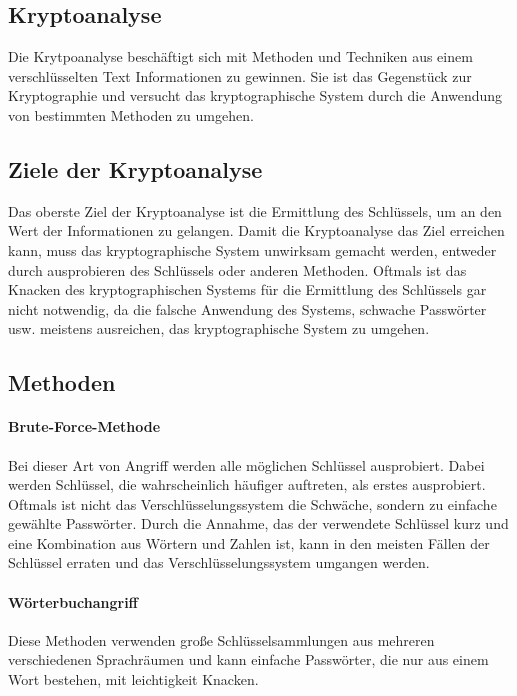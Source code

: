 \documentclass[12pt,a4paper]{report}
\begin{document}
\begin{onehalfspace}
\newpage
\section{Kryptoanalyse}

Die Krytpoanalyse beschäftigt sich mit Methoden und Techniken aus einem verschlüsselten Text Informationen zu gewinnen. Sie ist das Gegenstück zur Kryptographie und versucht das kryptographische System durch die Anwendung von bestimmten Methoden zu umgehen.

\subsection{Ziele der Kryptoanalyse}

Das oberste Ziel der Kryptoanalyse ist die Ermittlung des Schlüssels, um an den Wert der Informationen zu gelangen. Damit die Kryptoanalyse das Ziel erreichen kann, muss das kryptographische System unwirksam gemacht werden, entweder durch ausprobieren des Schlüssels oder anderen Methoden. Oftmals ist das Knacken des kryptographischen Systems für die Ermittlung des Schlüssels gar nicht notwendig, da die falsche Anwendung des Systems, schwache Passwörter usw. meistens ausreichen, das kryptographische System zu umgehen.

\subsection{Methoden}

\paragraph{Brute-Force-Methode} Bei dieser Art von Angriff werden alle möglichen Schlüssel ausprobiert. Dabei werden Schlüssel, die wahrscheinlich häufiger auftreten, als erstes ausprobiert. Oftmals ist nicht das Verschlüsselungssystem die Schwäche, sondern zu einfache gewählte Passwörter. Durch die Annahme, das der verwendete Schlüssel kurz und eine Kombination aus Wörtern und Zahlen ist, kann in den meisten Fällen der Schlüssel erraten und das Verschlüsselungssystem umgangen werden.

\paragraph{Wörterbuchangriff} Diese Methoden verwenden große Schlüsselsammlungen aus mehreren verschiedenen Sprachräumen und kann einfache Passwörter, die nur aus einem Wort bestehen, mit leichtigkeit Knacken.


\end{onehalfspace}
\end{document}
